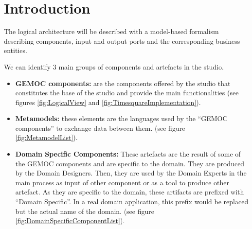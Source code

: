 \documentclass{gemoc} %
\begin{document}
\section{Introduction}
The logical architecture will be described with a model-based formalism describing components, input and output ports and the corresponding business entities.

We can identify 3 main groups of components and artefacts in the studio.

\begin{itemize}
	\item \textbf{GEMOC components:} are the components offered by the studio that constitutes the base of the studio and provide the main functionalities (see figures \ref{fig:LogicalView} and \ref{fig:TimesquareImplementation}).
	\item \textbf{Metamodels:} these elements are the languages used by the ``GEMOC components'' to exchange data between them. (see figure \ref{fig:MetamodelList}).
	\item \textbf{Domain Specific Components:} These artefacts are the result of some of the GEMOC components and are specific to the domain. They are produced by the Domain Designers. Then, they are used by the Domain Experts in the main process as input of other component or as a tool to produce other artefact. As they are specific to the domain, these artifacts are prefixed with ``Domain Specific''. In a real domain application, this prefix would be replaced but the actual name of the domain. (see figure \ref{fig:DomainSpecificComponentList}).
\end{itemize}
\end{document}
